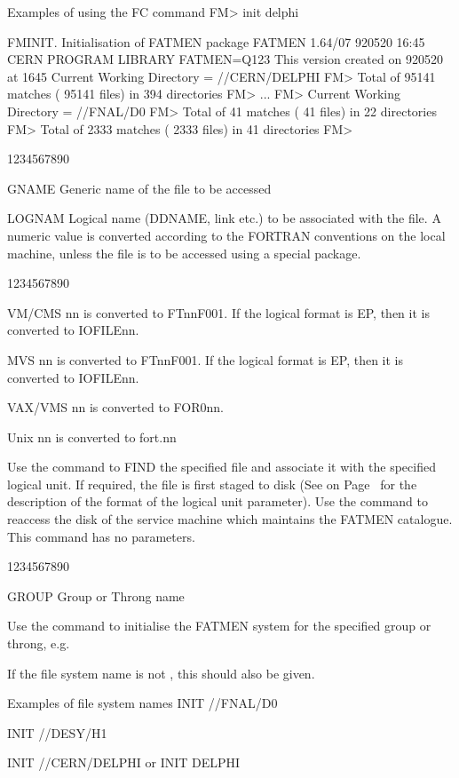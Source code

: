 \begin{XMPt}{Examples of using the FC command}
FM> init delphi 
  
 FMINIT.  Initialisation of FATMEN package
 FATMEN   1.64/07 920520 16:45 CERN PROGRAM LIBRARY FATMEN=Q123
          This version created on      920520  at        1645 
 Current Working Directory = //CERN/DELPHI
FM> 
 Total of  95141 matches ( 95141 files) in    394 directories
FM> ...
FM>  
Current Working Directory = //FNAL/D0
FM> 
Total of     41 matches (    41 files) in     22 directories
FM> 
Total of   2333 matches (  2333 files) in     41 directories
FM> 

\end{XMPt}
\begin{DLtt}{1234567890}
\item[GNAME]Generic name of the file to be accessed
\item[LOGNAM]Logical name (DDNAME, link etc.) to be associated with
the file. A numeric value is converted according to the FORTRAN
conventions on the local machine, unless the file is to be 
accessed using a special package.
\begin{DLtt}{1234567890}
\item[VM/CMS]nn is converted to FTnnF001. If the logical format is EP,
then it is converted to IOFILEnn.
\item[MVS]nn is converted to FTnnF001. If the logical format is EP,
then it is converted to IOFILEnn.
\item[VAX/VMS]nn is converted to FOR0nn.
\item[Unix]nn is converted to fort.nn
\end{DLtt}
\end{DLtt}
Use the  command to FIND the specified file and associate
it with the specified logical unit. If required, the file is
first staged to disk
(See on Page~\pageref{FMFIND} for
the description of the format of the logical unit parameter).
Use the  command to reaccess the disk of the service
machine which maintains the FATMEN catalogue. This command
has no parameters.
\begin{DLtt}{1234567890}
\item[GROUP]Group or Throng name
\end{DLtt}
Use the  command to initialise the FATMEN system for the specified
group or throng, e.g. 
\par
If the file system name is not , this should also be given.
\begin{XMPt}{Examples of file system names}
INIT //FNAL/D0

INIT //DESY/H1

INIT //CERN/DELPHI or INIT DELPHI
\end{XMPt}

